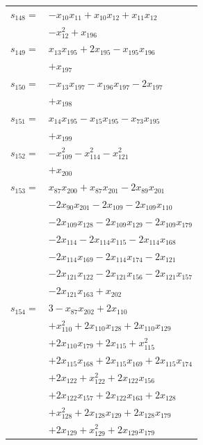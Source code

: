 \begin{longtable}{@{}r@{\;}l@{}}
\(s_{148}=\) & \(\displaystyle -x_{10}x_{11} +x_{10}x_{12} +x_{11}x_{12}\) \\
 & \(\displaystyle -x_{12}^{2} +x_{196}\) \\[3pt]
\(s_{149}=\) & \(\displaystyle x_{13}x_{195} +2x_{195} -x_{195}x_{196}\) \\
 & \(\displaystyle +x_{197}\) \\[3pt]
\(s_{150}=\) & \(\displaystyle -x_{13}x_{197} -x_{196}x_{197} -2x_{197}\) \\
 & \(\displaystyle +x_{198}\) \\[3pt]
\(s_{151}=\) & \(\displaystyle x_{14}x_{195} -x_{15}x_{195} -x_{73}x_{195}\) \\
 & \(\displaystyle +x_{199}\) \\[3pt]
\(s_{152}=\) & \(\displaystyle -x_{109}^{2} -x_{114}^{2} -x_{121}^{2}\) \\
 & \(\displaystyle +x_{200}\) \\[3pt]
\(s_{153}=\) & \(\displaystyle x_{87}x_{200} +x_{87}x_{201} -2x_{89}x_{201}\) \\
 & \(\displaystyle -2x_{90}x_{201} -2x_{109} -2x_{109}x_{110}\) \\
 & \(\displaystyle -2x_{109}x_{128} -2x_{109}x_{129} -2x_{109}x_{179}\) \\
 & \(\displaystyle -2x_{114} -2x_{114}x_{115} -2x_{114}x_{168}\) \\
 & \(\displaystyle -2x_{114}x_{169} -2x_{114}x_{174} -2x_{121}\) \\
 & \(\displaystyle -2x_{121}x_{122} -2x_{121}x_{156} -2x_{121}x_{157}\) \\
 & \(\displaystyle -2x_{121}x_{163} +x_{202}\) \\[3pt]
\(s_{154}=\) & \(\displaystyle 3 -x_{87}x_{202} +2x_{110}\) \\
 & \(\displaystyle +x_{110}^{2} +2x_{110}x_{128} +2x_{110}x_{129}\) \\
 & \(\displaystyle +2x_{110}x_{179} +2x_{115} +x_{115}^{2}\) \\
 & \(\displaystyle +2x_{115}x_{168} +2x_{115}x_{169} +2x_{115}x_{174}\) \\
 & \(\displaystyle +2x_{122} +x_{122}^{2} +2x_{122}x_{156}\) \\
 & \(\displaystyle +2x_{122}x_{157} +2x_{122}x_{163} +2x_{128}\) \\
 & \(\displaystyle +x_{128}^{2} +2x_{128}x_{129} +2x_{128}x_{179}\) \\
 & \(\displaystyle +2x_{129} +x_{129}^{2} +2x_{129}x_{179}\) \\

\end{longtable}
